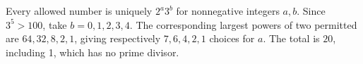Every allowed number is uniquely $2^a3^b$ for nonnegative integers $a,b$. Since $3^5>100$, take $b=0,1,2,3,4$. The corresponding largest powers of two permitted are $64,32,8,2,1$, giving respectively $7,6,4,2,1$ choices for $a$. The total is $\boxed{20}$, including 1, which has no prime divisor.
